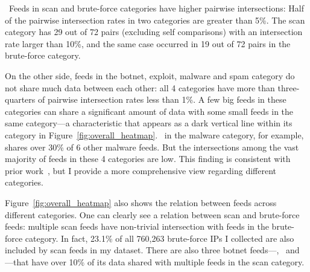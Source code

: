 
\finding\ Feeds in scan and brute-force categories have higher pairwise intersections: Half of the pairwise intersection rates in two categories are greater than 5\%. The scan category has 29 out of 72 pairs (excluding self comparisons) with an intersection rate larger than 10\%, and the same case occurred in 19 out of 72 pairs in the brute-force category.

On the other side, feeds in the botnet, exploit, malware and spam category do not share much data between each other: all 4 categories have more than three-quarters of pairwise intersection rates less than 1\%. A few big feeds in these categories can share a significant amount of data with some small feeds in the same category---a characteristic that appears as a dark vertical line within its category in Figure~\ref{fig:overall_heatmap}. \feedetiprep\ in the malware category, for example, shares over 30\% of 6 other malware feeds. But the intersections among the vast majority of feeds in these 4 categories are low. This finding is consistent with prior work~\cite{metcalf2015blacklist,thomas2016abuse}, but I provide a more comprehensive view regarding different categories.

Figure~\ref{fig:overall_heatmap} also shows the relation between feeds across different categories. One can clearly see a relation between scan and brute-force feeds: multiple scan feeds have non-trivial intersection with feeds in the brute-force category. In fact, 23.1\% of all 760,263 brute-force IPs I collected are also included by scan feeds in my dataset. There are also three botnet feeds---\feedTSCI, \feedTSVoIP\ and \feedTSCompr---that have over 10\% of its data shared with multiple feeds in the scan category.